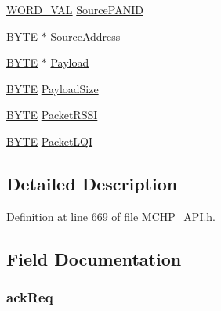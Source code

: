 \begin{DoxyCompactItemize}
\begin{tabbing}
\end{tabbing}\item 
\hyperlink{union_w_o_r_d___v_a_l}{W\+O\+R\+D\+\_\+\+V\+A\+L} \hyperlink{struct_r_e_c_e_i_v_e_d___m_e_s_s_a_g_e_a5969a71be30ca119a6c3b73d85f26bd4}{Source\+P\+A\+N\+I\+D}
\item 
\hyperlink{_generic_type_defs_8h_a4ae1dab0fb4b072a66584546209e7d58}{B\+Y\+T\+E} $\ast$ \hyperlink{struct_r_e_c_e_i_v_e_d___m_e_s_s_a_g_e_a74f4c6eb6c47cbaa15f9c3861ad8574f}{Source\+Address}
\item 
\hyperlink{_generic_type_defs_8h_a4ae1dab0fb4b072a66584546209e7d58}{B\+Y\+T\+E} $\ast$ \hyperlink{struct_r_e_c_e_i_v_e_d___m_e_s_s_a_g_e_abccf8a840583e2a3de0a3681da6e7cd4}{Payload}
\item 
\hyperlink{_generic_type_defs_8h_a4ae1dab0fb4b072a66584546209e7d58}{B\+Y\+T\+E} \hyperlink{struct_r_e_c_e_i_v_e_d___m_e_s_s_a_g_e_a9d67da0b2f7742cad6cc8e6fa6d51580}{Payload\+Size}
\item 
\hyperlink{_generic_type_defs_8h_a4ae1dab0fb4b072a66584546209e7d58}{B\+Y\+T\+E} \hyperlink{struct_r_e_c_e_i_v_e_d___m_e_s_s_a_g_e_a5673af666692e2d8645eed47ce070f89}{Packet\+R\+S\+S\+I}
\item 
\hyperlink{_generic_type_defs_8h_a4ae1dab0fb4b072a66584546209e7d58}{B\+Y\+T\+E} \hyperlink{struct_r_e_c_e_i_v_e_d___m_e_s_s_a_g_e_ab77c31c0afa242b501a165d1b2a1e5d4}{Packet\+L\+Q\+I}
\end{DoxyCompactItemize}


\subsection{Detailed Description}


Definition at line 669 of file M\+C\+H\+P\+\_\+\+A\+P\+I.\+h.



\subsection{Field Documentation}
\hypertarget{struct_r_e_c_e_i_v_e_d___m_e_s_s_a_g_e_ad6d800fe3f8e6e8dba107e2c4df200c0}{}
\subsubsection[{ack\+Req}]{ ack\+Req}\label{struct_r_e_c_e_i_v_e_d___m_e_s_s_a_g_e_ad6d800fe3f8e6e8dba107e2c4df200c0}



